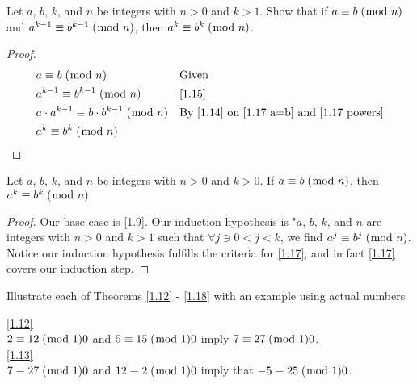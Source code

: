 \documentclass[../main.tex]{subfiles}
\begin{document}
\begin{ex} \label{1.17}
Let $a$, $b$, $k$, and $n$ be integers with $n > 0$ and $k > 1$. Show that if $a \equiv b \; (\bmod \; n)$ and $a^{k-1} \equiv b^{k-1} \; (\bmod \; n)$, then $a^k \equiv b^k \; (\bmod \; n)$.
\end{ex}

\begin{proof}
\begin{align}
    \label{1.17 a=b}
    &a \equiv b \; (\bmod \; n) && \mbox{Given} \\
    \label{1.17 powers}
    &a^{k-1} \equiv b^{k-1} \; (\bmod \; n) && \mbox{\ref{1.15}} \\
    &a \cdot a^{k-1} \equiv b \cdot b^{k-1} \; (\bmod \; n) && \mbox{By \ref{1.14} on \eqref{1.17 a=b} and \eqref{1.17 powers}} \\
    &a^k \equiv b^k \; (\bmod \; n) && \qedhere
\end{align}
\end{proof}



\begin{thm} \label{1.18}
Let $a$, $b$, $k$, and $n$ be integers with $n > 0$ and $k > 0$. If $a \equiv b \; (\bmod \; n)$, then $a^k \equiv b^k \; (\bmod \; n)$
\end{thm}

\begin{proof} Our base case is \ref{1.9}. Our induction hypothesis is "$a$, $b$, $k$, and $n$ are integers with $n >0$ and $k > 1$ such that $\forall j \ni 0 < j < k$, we find $a^j \equiv b^j \; (\bmod \; n)$. Notice our induction hypothesis fulfills the criteria for \ref{1.17}, and in fact \ref{1.17} covers our induction step.
\end{proof}



\pagebreak



\begin{ex} \label{1.19}
Illustrate each of Theorems \ref{1.12} - \ref{1.18} with an example using actual numbers
\end{ex}

\hspace*{5mm} \ref{1.12} \\
\hspace*{15mm} $2 \equiv 12 \; (\bmod \; 1)0$ and $5 \equiv 15 \; (\bmod \; 1)0$ imply $7 \equiv 27 \; (\bmod \; 1)0$. \\

\hspace*{5mm} \ref{1.13} \\
\hspace*{15mm} $7 \equiv 27 \; (\bmod \; 1)0$ and $12 \equiv 2 \; (\bmod \; 1)0$ imply that $-5 \equiv 25 \; (\bmod \; 1)0$. \\
\end{document}
